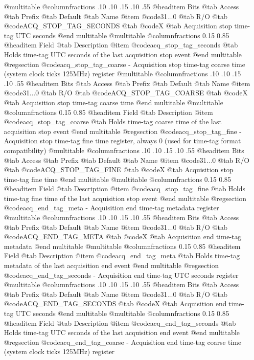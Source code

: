 @multitable @columnfractions .10 .10 .15 .10 .55
@headitem Bits @tab Access @tab Prefix @tab Default @tab Name
@item @code{31...0}
@tab R/O @tab
@code{ACQ_STOP_TAG_SECONDS}
@tab @code{X} @tab 
Acquisition stop time-tag UTC seconds
@end multitable
@multitable @columnfractions 0.15 0.85
@headitem Field @tab Description
@item @code{acq_stop_tag_seconds} @tab Holds time-tag UTC seconds of the last acquisition stop event
@end multitable
@regsection @code{acq_stop_tag_coarse} - Acquisition stop time-tag coarse time (system clock ticks 125MHz) register
@multitable @columnfractions .10 .10 .15 .10 .55
@headitem Bits @tab Access @tab Prefix @tab Default @tab Name
@item @code{31...0}
@tab R/O @tab
@code{ACQ_STOP_TAG_COARSE}
@tab @code{X} @tab 
Acquisition stop time-tag coarse time
@end multitable
@multitable @columnfractions 0.15 0.85
@headitem Field @tab Description
@item @code{acq_stop_tag_coarse} @tab Holds time-tag coarse time of the last acquisition stop event
@end multitable
@regsection @code{acq_stop_tag_fine} - Acquisition stop time-tag fine time register, always 0 (used for time-tag format compatibility)
@multitable @columnfractions .10 .10 .15 .10 .55
@headitem Bits @tab Access @tab Prefix @tab Default @tab Name
@item @code{31...0}
@tab R/O @tab
@code{ACQ_STOP_TAG_FINE}
@tab @code{X} @tab 
Acquisition stop time-tag fine time
@end multitable
@multitable @columnfractions 0.15 0.85
@headitem Field @tab Description
@item @code{acq_stop_tag_fine} @tab Holds time-tag fine time of the last acquisition stop event
@end multitable
@regsection @code{acq_end_tag_meta} - Acquisition end time-tag metadata register
@multitable @columnfractions .10 .10 .15 .10 .55
@headitem Bits @tab Access @tab Prefix @tab Default @tab Name
@item @code{31...0}
@tab R/O @tab
@code{ACQ_END_TAG_META}
@tab @code{X} @tab 
Acquisition end time-tag metadata
@end multitable
@multitable @columnfractions 0.15 0.85
@headitem Field @tab Description
@item @code{acq_end_tag_meta} @tab Holds time-tag metadata of the last acquisition end event
@end multitable
@regsection @code{acq_end_tag_seconds} - Acquisition end time-tag UTC seconds register
@multitable @columnfractions .10 .10 .15 .10 .55
@headitem Bits @tab Access @tab Prefix @tab Default @tab Name
@item @code{31...0}
@tab R/O @tab
@code{ACQ_END_TAG_SECONDS}
@tab @code{X} @tab 
Acquisition end time-tag UTC seconds
@end multitable
@multitable @columnfractions 0.15 0.85
@headitem Field @tab Description
@item @code{acq_end_tag_seconds} @tab Holds time-tag UTC seconds of the last acquisition end event
@end multitable
@regsection @code{acq_end_tag_coarse} - Acquisition end time-tag coarse time (system clock ticks 125MHz) register
